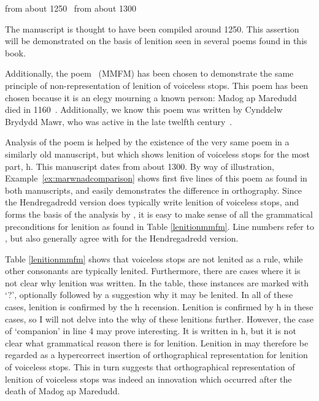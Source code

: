 from about 1250~\autocite[xxiv]{jones_rhagymadrodd_1982}
 from about 1300~\autocite{huws_llawysgrif_1981}

The manuscript is thought to have been compiled around 1250. This assertion will be demonstrated on the basis of lenition seen in several poems found in this book.

Additionally, the poem ~(MMFM) has been chosen to demonstrate the same principle of non-representation of lenition of voiceless stops. This poem has been chosen because it is an elegy mourning a known person: Madog ap Maredudd died in 1160~\autocite[82]{jones_gwaith_1991}. Additionally, we know this poem was written by Cynddelw Brydydd Mawr, who was active in the late twelfth century~\autocite[xxx]{jones_gwaith_1991}.


Analysis of the poem is helped by the existence of the very same poem in a similarly old manuscript, but which shows lenition of voiceless stops for the most part, \ie \gls{h}. This manuscript dates from about 1300. By way of illustration, Example~\ref{ex:marwnadcomparison} shows first five lines of this poem as found in both manuscripts, and easily demonstrates the difference in orthography. Since the Hendregadredd version does typically write lenition of voiceless stops, and forms the basis of the analysis by \textcite[82--91]{jones_gwaith_1991}, it is easy to make sense of all the grammatical preconditions for lenition as found in Table \ref{lenitionmmfm}. Line numbers refer to \textcite[78-79]{jarman_llyfr_1982}, but also generally agree with \textcite[82--91]{jones_gwaith_1991} for the Hendregadredd version.

Table \ref{lenitionmmfm} shows that voiceless stops are not lenited as a rule, while other consonants are typically lenited. Furthermore, there are cases where it is not clear why lenition was written. In the table, these instances are marked with `?', optionally followed by a suggestion why it may be lenited. In all of these cases, lenition is confirmed by the \gls{h} recension. Lenition is confirmed by \gls{h} in these cases, so I will not delve into the why of these lenitions further. However, the case of  `companion' in line 4 may prove interesting. It is written  in \gls{h}, but it is not clear what grammatical reason there is for lenition. Lenition in  may therefore be regarded as a hypercorrect insertion of orthographical representation for lenition of voiceless stops. This in turn suggests that orthographical representation of lenition of voiceless stops was indeed an innovation which occurred after the death of Madog ap Maredudd. 

